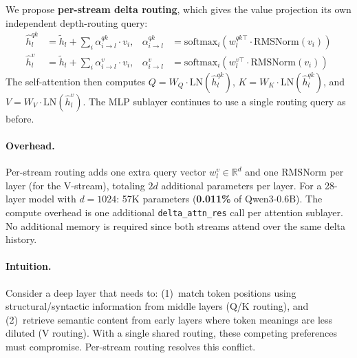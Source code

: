 \documentclass{article}
\begin{document}
We propose \textbf{per-stream delta routing}, which gives the value projection its own independent depth-routing query:
\begin{align}
    \hat{h}_l^{qk} &= \tilde{h}_l + \sum_{i} \alpha_{i \to l}^{qk} \cdot v_i, &
    \alpha_{i \to l}^{qk} &= \mathrm{softmax}_i(w_l^{qk \top} \cdot \mathrm{RMSNorm}(v_i)) \label{eq:qk_routing} \\
    \hat{h}_l^{v} &= \tilde{h}_l + \sum_{i} \alpha_{i \to l}^{v} \cdot v_i, &
    \alpha_{i \to l}^{v} &= \mathrm{softmax}_i(w_l^{v \top} \cdot \mathrm{RMSNorm}(v_i)) \label{eq:v_routing}
\end{align}
The self-attention then computes $Q = W_Q \cdot \mathrm{LN}(\hat{h}_l^{qk})$, $K = W_K \cdot \mathrm{LN}(\hat{h}_l^{qk})$, and $V = W_V \cdot \mathrm{LN}(\hat{h}_l^{v})$. The MLP sublayer continues to use a single routing query as before.

\paragraph{Overhead.} Per-stream routing adds one extra query vector $w_l^v \in \mathbb{R}^d$ and one RMSNorm per layer (for the V-stream), totaling $2d$ additional parameters per layer. For a 28-layer model with $d{=}1024$: 57K parameters (\textbf{0.011\%} of Qwen3-0.6B). The compute overhead is one additional \texttt{delta\_attn\_res} call per attention sublayer. No additional memory is required since both streams attend over the same delta history.

\paragraph{Intuition.} Consider a deep layer that needs to: (1)~match token positions using structural/syntactic information from middle layers (Q/K routing), and (2)~retrieve semantic content from early layers where token meanings are less diluted (V routing). With a single shared routing, these competing preferences must compromise. Per-stream routing resolves this conflict.
\end{document}
